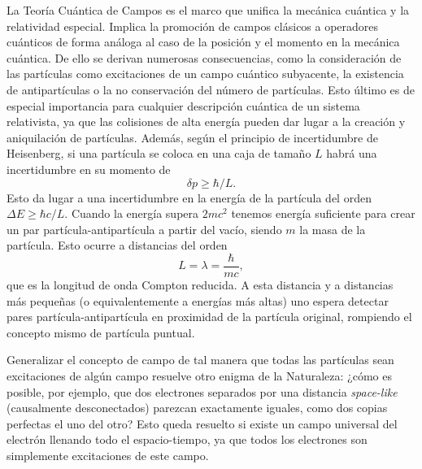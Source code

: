 La Teoría Cuántica de Campos es el marco que unifica la mecánica cuántica y la relatividad especial. Implica la promoción de campos clásicos a operadores cuánticos de forma análoga al caso de la posición y el momento en la mecánica cuántica. De ello se derivan numerosas consecuencias, como la consideración de las partículas como excitaciones de un campo cuántico subyacente, la existencia de antipartículas o la no conservación del número de partículas. Esto último es de especial importancia para cualquier descripción cuántica de un sistema relativista, ya que las colisiones de alta energía pueden dar lugar a la creación y aniquilación de partículas. Además, según el principio de incertidumbre de Heisenberg, si una partícula se coloca en una caja de tamaño $L$ habrá una incertidumbre en su momento de
\begin{equation*}
\delta p\geq\hbar/L.
\end{equation*}
Esto da lugar a una incertidumbre en la energía de la partícula del orden $\Delta E\geq\hbar c/L$. Cuando la energía supera $2mc^2$ tenemos energía suficiente para crear un par partícula-antipartícula a partir del vacío, siendo $m$ la masa de la partícula. Esto ocurre a distancias del orden 
\begin{equation*}
L=\lambda=\frac{\hbar}{mc},
\end{equation*}
que es la longitud de onda Compton reducida. A esta distancia y a distancias más pequeñas (o equivalentemente a energías más altas) uno espera detectar pares partícula-antipartícula en proximidad de la partícula original, rompiendo el concepto mismo de partícula puntual. 

Generalizar el concepto de campo de tal manera que todas las partículas sean excitaciones de algún campo resuelve otro enigma de la Naturaleza: ¿cómo es posible, por ejemplo, que dos electrones separados por una distancia \textit{space-like} (causalmente desconectados) parezcan exactamente iguales, como dos copias perfectas el uno del otro? Esto queda resuelto si existe un campo universal del electrón llenando todo el espacio-tiempo, ya que todos los electrones son simplemente excitaciones de este campo. 


